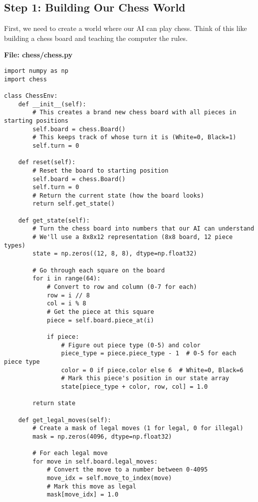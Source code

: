 \documentclass[11pt]{article}
\begin{document}
\subsection{Step 1: Building Our Chess World}

First, we need to create a world where our AI can play chess. Think of this like building a chess board and teaching the computer the rules.

\begin{tcolorbox}[colback=green!5!white,colframe=green!75!black,title=Creating the Chess Environment]
\textbf{File: chess/chess.py}
\begin{lstlisting}[style=Python]
import numpy as np
import chess

class ChessEnv:
    def __init__(self):
        # This creates a brand new chess board with all pieces in starting positions
        self.board = chess.Board()
        # This keeps track of whose turn it is (White=0, Black=1)
        self.turn = 0
        
    def reset(self):
        # Reset the board to starting position
        self.board = chess.Board()
        self.turn = 0
        # Return the current state (how the board looks)
        return self.get_state()
        
    def get_state(self):
        # Turn the chess board into numbers that our AI can understand
        # We'll use a 8x8x12 representation (8x8 board, 12 piece types)
        state = np.zeros((12, 8, 8), dtype=np.float32)
        
        # Go through each square on the board
        for i in range(64):
            # Convert to row and column (0-7 for each)
            row = i // 8
            col = i % 8
            # Get the piece at this square
            piece = self.board.piece_at(i)
            
            if piece:
                # Figure out piece type (0-5) and color
                piece_type = piece.piece_type - 1  # 0-5 for each piece type
                color = 0 if piece.color else 6  # White=0, Black=6
                # Mark this piece's position in our state array
                state[piece_type + color, row, col] = 1.0
                
        return state
    
    def get_legal_moves(self):
        # Create a mask of legal moves (1 for legal, 0 for illegal)
        mask = np.zeros(4096, dtype=np.float32)
        
        # For each legal move
        for move in self.board.legal_moves:
            # Convert the move to a number between 0-4095
            move_idx = self.move_to_index(move)
            # Mark this move as legal
            mask[move_idx] = 1.0
            

\end{lstlisting}
\end{tcolorbox}
\end{document}
